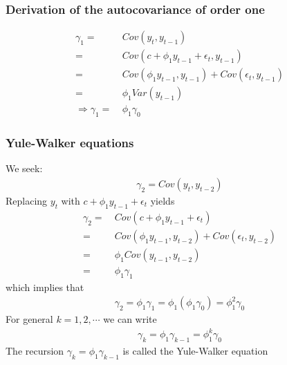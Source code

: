 \documentclass[a4paper,twoside,11pt]{article}
\begin{document}
\subsubsection{Derivation of the autocovariance of order one}
\begin{equation*}
\begin{aligned}
\gamma_1 =& \  Cov(y_t, y_{t-1})  \\
=& \ Cov(c+ \phi_1 y_{t-1} + \epsilon_t, y_{t-1}) \\
=& \ Cov(\phi_1 y_{t-1}, y_{t-1}) + Cov(\epsilon_t, y_{t-1}) \\
=& \ \phi_1 Var(y_{t-1}) \\
\Rightarrow \gamma_1 =& \ \phi_1 \gamma_0
\end{aligned}
\end{equation*}
\begin{shaded*}
\subsubsection{Yule-Walker equations}
We seek:
\begin{equation*}
\begin{aligned}
\gamma_2 = Cov(y_t, y_{t-2})
\end{aligned}
\end{equation*}
Replacing $y_t$ with $c+\phi_1 y_{t-1} + \epsilon_t$ yields
\begin{equation*}
\begin{aligned}
\gamma_2 =& \ Cov(c+\phi_1 y_{t-1} + \epsilon_t) \\
=& \ Cov(\phi_1 y_{t-1}, y_{t-2}) + Cov(\epsilon_t, y_{t-2}) \\
=& \  \phi_1 Cov(y_{t-1}, y_{t-2}) \\
=& \ \phi_1 \gamma_1
\end{aligned}
\end{equation*}
which implies that 
\begin{equation*}
\begin{aligned}
\gamma_2 = \phi_1 \gamma_1 = \phi_1(\phi_1 \gamma_0)=\phi_1^2 \gamma_0
\end{aligned}
\end{equation*}
For general $k=1,2,\cdots$ we can write
\begin{equation*}
\begin{aligned}
\gamma_k = \phi_1 \gamma_{k-1} = \phi_1^k \gamma_0
\end{aligned}
\end{equation*}
The recursion $\gamma_k = \phi_1 \gamma_{k-1}$ is called the Yule-Walker equation
\end{shaded*}
\end{document}
